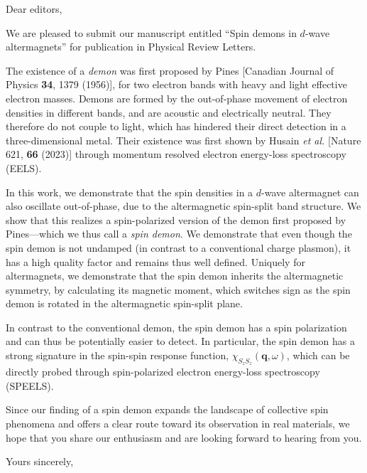 \documentclass{letter}
\begin{document}
	
	\begin{letter}{}
		\opening{Dear editors,}
		
		
		We are pleased to submit our manuscript entitled ``Spin demons in $d$-wave altermagnets'' for publication in Physical Review Letters.
		
		
		The existence of a \emph{demon} was first proposed by Pines [Canadian Journal of Physics \textbf{34}, 1379 (1956)], for two electron bands with heavy and light effective electron masses. Demons are formed by the out-of-phase movement of electron densities in different bands, and are acoustic and electrically neutral. They therefore do not couple to light, which has hindered their direct detection in a three-dimensional metal. Their existence was first shown by Husain \textit{et al.} [Nature 621, \textbf{66} (2023)] through momentum resolved electron energy-loss spectroscopy (EELS). 
		
		In this work, we demonstrate that the spin densities in a $d$-wave altermagnet can also oscillate out-of-phase, due to the altermagnetic spin-split band structure.  We show that this realizes a spin-polarized version of the demon first proposed by Pines---which we thus call a \emph{spin demon}. We demonstrate that even though the spin demon is not undamped (in contrast to a conventional charge plasmon), it has a high quality factor and remains thus well defined.
		Uniquely for altermagnets, we demonstrate that the spin demon inherits the altermagnetic symmetry, by calculating its magnetic moment, which switches sign as the spin demon is rotated in the altermagnetic spin-split plane.
		
		
		In contrast to the conventional demon, the spin demon has a spin polarization and can thus be potentially easier to detect. In particular, the spin demon has a strong signature in the spin-spin response function, $\chi_{S_zS_z}(\bm q,\omega)$, which can be directly probed through
		spin-polarized electron energy-loss spectroscopy (SPEELS). 
		
		Since our finding of a spin demon expands the landscape of collective spin phenomena and offers a clear route toward its observation in real materials, we hope that you share our enthusiasm and are looking forward to hearing from you.
		
		\closing{Yours sincerely,}
		
		
		
		
	\end{letter}
\end{document}
